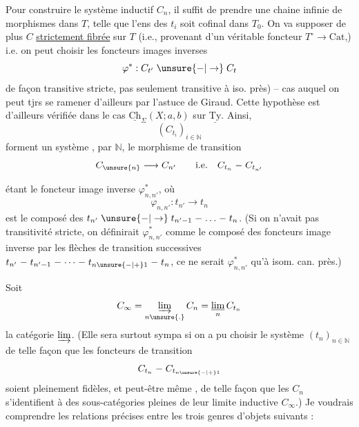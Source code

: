 Pour construire le système inductif $C_n$, il suffit de prendre une chaine infinie
de morphismes dans $T$, telle que l'ens des $t_i$ soit cofinal  dans $T_0$.  On va supposer de plus $C$ \uline{strictement fibrée} sur  $T$ (i.e., provenant d'un véritable foncteur $T^\circ\longrightarrow\mathrm{Cat}$,) i.e. on peut choisir les foncteurs images inverses \deleted{$\unsure{\varphi}$}
\[
\varphi^*:C_{t'}\mathrel{\unsure{-|\to}}C_t
\]
de façon transitive stricte, pas seulement transitive à iso. près) -- cas auquel on peut tjrs se ramener d'ailleurs par l'astuce de Giraud. Cette hypothèse est d'ailleurs vérifiée dans le cas $\underline{\mathrm{Ch}}_\Sigma(X;a,b)$ sur $\underline{\mathrm{Ty}}$. Ainsi, 
\[
(C_{t_i})_{i\in\mathbb N}
\]
forment un système    ,  par $\mathbb N$, le morphisme de transition
\[
C_{\unsure{n}}\longrightarrow C_{n'}\qquad\text{i.e.}\quad C_{t_n}\mathrel{-}C_{t_{n'}}
\]


étant le foncteur image inverse $\varphi_{n,n'}^*$, où
\[
\varphi_{n,n'}:t_{n'}\longrightarrow t_n
\]
est le composé des $t_{n'}\mathrel{\unsure{-|\to}}t_{n'-1}\mathrel{-}\ldots\mathrel{-}t_n$. (Si on n'avait pas transitivité stricte, on définirait $\varphi_{n,n'}^*$ comme le composé des foncteurs image inverse par les flèches de transition successives $t_{n'}\mathrel{-}t_{n'-1}\mathrel{-}\cdots\mathrel{-}t_{n\unsure{-|+}1}\mathrel{-}t_n$, ce ne serait $\varphi_{n,n'}^*$ qu'à isom. can. près.)

Soit 
\[
C_\infty=\underset{n\unsure{.}}{\varinjlim}\,C_n=\underset{n}{\underline{\lim}}\,C_{t_n}
\]
la catégorie $\varinjlim$. (Elle sera surtout sympa si on a pu choisir le système $(t_n)_{n\in\mathbb N}$ de telle façon que les foncteurs de transition
\[
C_{t_n}\mathrel{-}C_{t_{n\unsure{-|+}1}}
\]
soient pleinement fidèles, et peut-être même , de telle façon que les $C_n$ s'identifient à des sous-catégories pleines de leur limite inductive $C_\infty$.) Je voudrais comprendre les relations précises entre les trois genres d'objets suivants :

